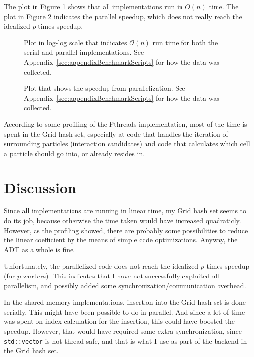 \documentclass[12pt,a4paper]{article}
\begin{document}
The plot in Figure \ref{fig:linear} shows that all implementations run in
$O(n)$ time. The plot in Figure \ref{fig:speedup} indicates the parallel
speedup, which does not really reach the idealized $p$-times speedup.

\begin{figure}[h]
    \begin{center}
        
        \caption{Plot in log-log scale that indicates $\mathcal{O}(n)$ run time for
        both the serial and parallel implementations. See
        Appendix~\ref{sec:appendixBenchmarkScripts} for how the data was collected.} 
        \label{fig:linear}
    \end{center}
\end{figure}

\begin{figure}[h]
    \begin{center}
        
        \caption{Plot that shows the speedup from parallelization. See
        Appendix~\ref{sec:appendixBenchmarkScripts} for how the data was
        collected.} 
        \label{fig:speedup}
    \end{center}
\end{figure}


According to some profiling of the Pthreads implementation, most of the time is
spent in the Grid hash set, especially at code that handles the iteration of
surrounding particles (interaction candidates) and code that calculates which
cell a particle should go into, or already resides in.


\section{Discussion}

Since all implementations are running in linear time, my Grid hash set seems to
do its job, because otherwise the time taken would have increased quadraticly.
However, as the profiling showed, there are probably some possibilities to
reduce the linear coefficient by the means of simple code optimizations.
Anyway, the ADT as a whole is fine.

Unfortunately, the parallelized code does not reach the idealized $p$-times
speedup (for $p$ workers). This indicates that I have not successfully
exploited all parallelism, and possibly added some
synchronization/communication overhead.

In the shared memory implementations, insertion into the Grid hash set is done
serially. This might have been possible to do in parallel. And since a lot of
time was spent on index calculation for the insertion, this could have boosted
the speedup. However, that would have required some extra synchronization,
since \texttt{std::vector} is not thread safe, and that is what I use as part
of the backend in the Grid hash set. 
\end{document}
